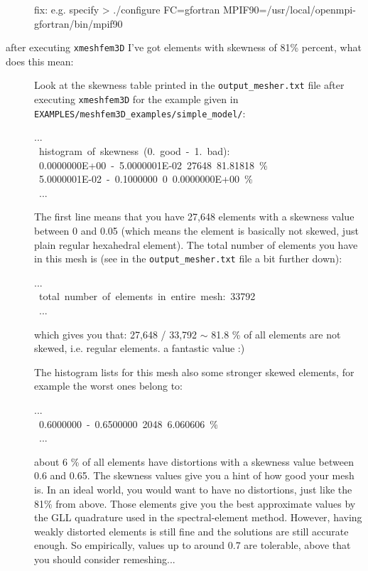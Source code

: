 \begin{description}
fix: e.g. specify > ./configure FC=gfortran MPIF90=/usr/local/openmpi-gfortran/bin/mpif90

\item [{after executing \texttt{xmeshfem3D} I've got elements with skewness of 81\% percent, what does this mean:}] Look
at the skewness table printed in the \texttt{output\_mesher.txt} file
after executing \texttt{xmeshfem3D} for the example given in \texttt{EXAMPLES/meshfem3D\_examples/simple\_model/}:

\begin{lyxcode}
...~~\\
~histogram~of~skewness~(0.~good~-~1.~bad):~~~\\
~0.0000000E+00~-~5.0000001E-02~27648~81.81818~\%~~~\\
~5.0000001E-02~-~0.1000000~0~0.0000000E+00~\%~~~\\
~...~~~\\

\end{lyxcode}

The first line means that you have 27,648 elements with a skewness
value between 0 and 0.05 (which means the element is basically not
skewed, just plain regular hexahedral element). The total number of
elements you have in this mesh is (see in the \texttt{output\_mesher.txt}
file a bit further down):
\begin{lyxcode}
...~~\\
~total~number~of~elements~in~entire~mesh:~33792~~~\\
~...~~~\\

\end{lyxcode}

which gives you that: 27,648 / 33,792 $\sim$ 81.8 \% of all elements
are not skewed, i.e. regular elements. a fantastic value :)


The histogram lists for this mesh also some stronger skewed elements,
for example the worst ones belong to:
\begin{lyxcode}
...~~\\
~0.6000000~-~0.6500000~2048~6.060606~\%~~~\\
~...~~~\\

\end{lyxcode}

about 6 \% of all elements have distortions with a skewness value
between 0.6 and 0.65. The skewness values give you a hint of how good
your mesh is. In an ideal world, you would want to have no distortions,
just like the 81\% from above. Those elements give you the best approximate
values by the GLL quadrature used in the spectral-element method.
However, having weakly distorted elements is still fine and the solutions
are still accurate enough. So empirically, values up to around 0.7
are tolerable, above that you should consider remeshing...



\end{description}
